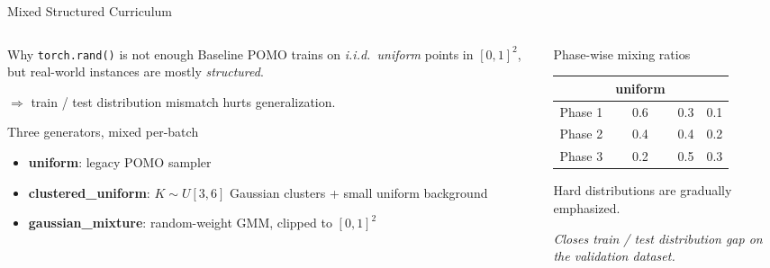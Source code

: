 \documentclass[aspectratio=169,11pt]{beamer}
\newcommand{\compacttable}{%
  \scriptsize
  \setlength{\tabcolsep}{2.2pt}%
  \renewcommand{\arraystretch}{1.08}%
}
\newcommand{\tightitems}{%
  \setlength{\itemsep}{1.5pt}%
  \setlength{\parsep}{0pt}%
  \setlength{\topsep}{2pt}%
}
\begin{document}
\begin{frame}[t]{Mixed Structured Curriculum}
  \small
  \begin{columns}[T,onlytextwidth]
    \begin{column}{0.55\textwidth}
      \begin{block}{Why \texttt{torch.rand()} is not enough}
        Baseline POMO trains on \emph{i.i.d.\ uniform} points in $[0,1]^2$,
        but real-world instances are mostly \emph{structured}.

        \vspace{0.05cm}
        $\Rightarrow$ train / test distribution mismatch hurts generalization.
      \end{block}
      \begin{block}{Three generators, mixed per-batch}
        \begin{itemize}\tightitems
          \item \textbf{uniform}: legacy POMO sampler
          \item \textbf{clustered\_uniform}: $K\sim U[3,6]$ Gaussian clusters + small uniform background
          \item \textbf{gaussian\_mixture}: random-weight GMM, clipped to $[0,1]^2$
        \end{itemize}
      \end{block}
    \end{column}
    \hfill
    \begin{column}{0.42\textwidth}
      \begin{block}{Phase-wise mixing ratios}
        \compacttable
        \begin{tabularx}{\linewidth}{@{}Y c c c@{}}
          \toprule
                  & uniform &  &  \\
          \midrule
          Phase 1 & 0.6     & 0.3       & 0.1      \\
          Phase 2 & 0.4     & 0.4       & 0.2      \\
          Phase 3 & 0.2     & 0.5       & 0.3      \\
          \bottomrule
        \end{tabularx}
        \par\vspace{0.16cm}
        Hard distributions are gradually emphasized.
      \end{block}
      \centering
      {\color{sdmblue}\itshape\small Closes train / test distribution gap on the validation dataset.}
    \end{column}
  \end{columns}
\end{frame}
\end{document}
